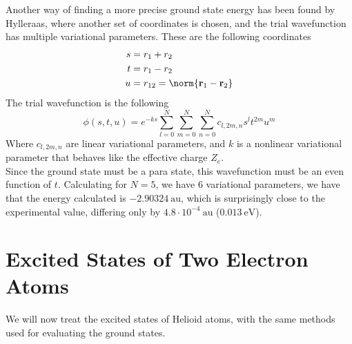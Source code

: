 \documentclass[a4paper, 11pt]{book}
\renewcommand{\vec}[1]{\mathbf{#1}}
\newcommand{\1}{\opr{\mathds{1}}}
\theoremstyle{plain}
\begin{document}
	Another way of finding a more precise ground state energy has been found by Hylleraas, where another set of coordinates is chosen, and the trial wavefunction has multiple variational parameters. These are the following coordinates
	\begin{equation*}
		\begin{aligned}
			s&=r_1+r_2\\
			t&=r_1-r_2\\
			u&=r_{12}=\norm{\vec{r}_1-\vec{r}_2}
		\end{aligned}
	\end{equation*}
	The trial wavefunction is the following
	\begin{equation*}
		\phi(s,t,u)=e^{-ks}\sum_{l=0}^N\sum_{m=0}^N\sum_{n=0}^Nc_{l,2m,n}s^lt^{2m}u^m
	\end{equation*}
	Where $c_{l,2m,n}$ are linear variational parameters, and $k$ is a nonlinear variational parameter that behaves like the effective charge $Z_e$.\\
	Since the ground state must be a para state, this wavefunction must be an even function of $t$. Calculating for $N=5$, we have $6$ variational parameters, we have that the energy calculated is $-2.90324\ \mathrm{au}$, which is surprisingly close to the experimental value, differing only by $4.8\cdot10^{-4}\ \mathrm{au}$ ($0.013\ \mathrm{eV}$).
	\section{Excited States of Two Electron Atoms}
	We will now treat the excited states of Helioid atoms, with the same methods used for evaluating the ground states.
\end{document}
